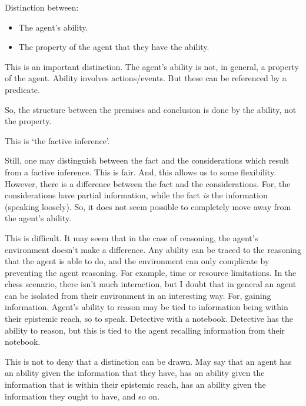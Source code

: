\documentclass[10pt]{article}
\begin{document}
\begin{note}[Ability]
  Distinction between:
  \begin{itemize}
  \item The agent's ability.
  \item The property of the agent that they have the ability.
  \end{itemize}
  This is an important distinction.
  The agent's ability is not, in general, a property of the agent.
  Ability involves actions/events.
  But these can be referenced by a predicate.

  So, the structure between the premises and conclusion is done by the ability, not the property.

  This is `the factive inference'.

  Still, one may distinguish between the fact and the considerations which result from a factive inference.
  This is fair.
  And, this allows us to some flexibility.
  However, there is a difference between the fact and the considerations.
  For, the considerations have partial information, while the fact \emph{is} the information (speaking loosely).
  So, it does not seem possible to completely move away from the agent's ability.
  
\end{note}

\begin{note}
  This is difficult.
  It may seem that in the case of reasoning, the agent's environment doesn't make a difference.
  Any ability can be traced to the reasoning that the agent is able to do, and the environment can only complicate by preventing the agent reasoning.
  For example, time or resource limitations.
  In the chess scenario, there isn't much interaction, but I doubt that in general an agent can be isolated from their environment in an interesting way.
  For, gaining information.
  Agent's ability to reason may be tied to information being within their epistemic reach, so to speak.
  Detective with a notebook.
  Detective has the ability to reason, but this is tied to the agent recalling information from their notebook.

  This is not to deny that a distinction can be drawn.
  May say that an agent has an ability given the information that they have, has an ability given the information that is within their epistemic reach, has an ability given the information they ought to have, and so on.
  
\end{note}
\end{document}
